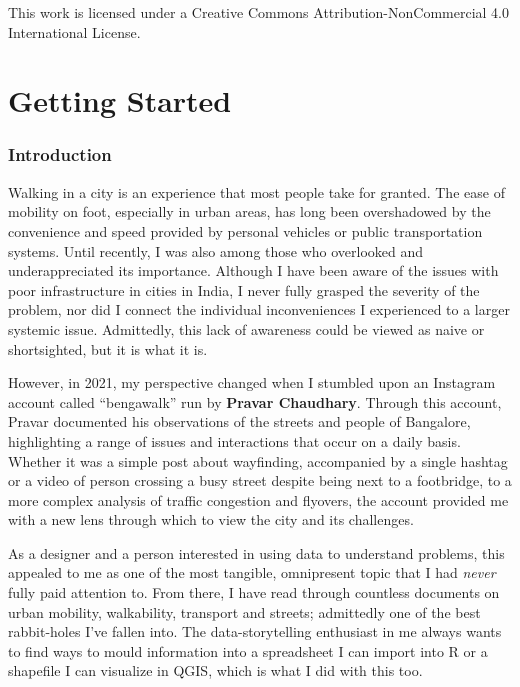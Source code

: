 \documentclass[
]{latex/krantz}
\begin{document}
This work is licensed under a Creative Commons Attribution-NonCommercial 4.0 International License.

\hypertarget{part-getting-started}{%
\part{Getting Started}\label{part-getting-started}}

\hypertarget{intro}{%
\section{Introduction}\label{intro}}

Walking in a city is an experience that most people take for granted. The ease of mobility on foot, especially in urban areas, has long been overshadowed by the convenience and speed provided by personal vehicles or public transportation systems. Until recently, I was also among those who overlooked and underappreciated its importance. Although I have been aware of the issues with poor infrastructure in cities in India, I never fully grasped the severity of the problem, nor did I connect the individual inconveniences I experienced to a larger systemic issue. Admittedly, this lack of awareness could be viewed as naive or shortsighted, but it is what it is.

However, in 2021, my perspective changed when I stumbled upon an Instagram account called ``bengawalk'' run by \textbf{Pravar Chaudhary}. Through this account, Pravar documented his observations of the streets and people of Bangalore, highlighting a range of issues and interactions that occur on a daily basis. Whether it was a simple post about wayfinding, accompanied by a single hashtag or a video of person crossing a busy street despite being next to a footbridge, to a more complex analysis of traffic congestion and flyovers, the account provided me with a new lens through which to view the city and its challenges.

As a designer and a person interested in using data to understand problems, this appealed to me as one of the most tangible, omnipresent topic that I had \emph{never} fully paid attention to. From there, I have read through countless documents on urban mobility, walkability, transport and streets; admittedly one of the best rabbit-holes I've fallen into. The data-storytelling enthusiast in me always wants to find ways to mould information into a spreadsheet I can import into R or a shapefile I can visualize in QGIS, which is what I did with this too.
\end{document}
